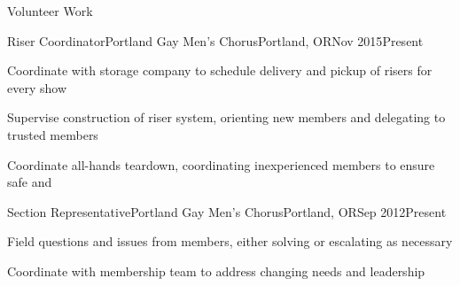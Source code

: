 \documentclass[letterpaper,12pt]{article}
\begin{document}
\begin{paracol}{2}
\begin{res_section}{Volunteer Work}
  \begin{res_experienceitem}{Riser Coordinator}{Portland Gay Men's Chorus}{Portland, OR}{Nov 2015}{Present}
    \item Coordinate with storage company to schedule delivery and pickup of risers for every show
    \item Supervise construction of riser system, orienting new members and delegating to trusted members
    \item Coordinate all-hands teardown, coordinating inexperienced members to ensure safe and 
  \end{res_experienceitem}
  \begin{res_experienceitem}{Section Representative}{Portland Gay Men's Chorus}{Portland, OR}{Sep 2012}{Present}
    \item Field questions and issues from members, either solving or escalating as necessary
    \item Coordinate with membership team to address changing needs and leadership
  \end{res_experienceitem}
\end{res_section}

\flushpage
\end{paracol}
\end{document}
